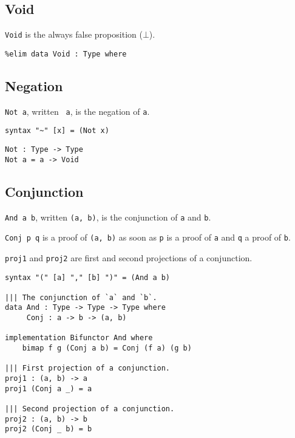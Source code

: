 \documentclass{acm_proc_article-sp}
\begin{document}
\subsection{Void}\label{void}

\texttt{Void} is the always false proposition (\(\bot\)).

\begin{verbatim}
%elim data Void : Type where
\end{verbatim}

\subsection{Negation}\label{negation}

\texttt{Not a}, written \texttt{~a}, is the
negation of \texttt{a}.

\begin{verbatim}
syntax "~" [x] = (Not x)
\end{verbatim}

\begin{verbatim}
Not : Type -> Type
Not a = a -> Void
\end{verbatim}

\subsection{Conjunction}\label{conjunction}

\texttt{And a b}, written \texttt{(a, b)}, is
the conjunction of \texttt{a} and \texttt{b}.

\texttt{Conj p q} is a proof of
\texttt{(a, b)} as soon as \texttt{p} is a
proof of \texttt{a} and \texttt{q} a proof of
\texttt{b}.

\texttt{proj1} and \texttt{proj2} are first
and second projections of a conjunction.

\begin{verbatim}
syntax "(" [a] "," [b] ")" = (And a b)

||| The conjunction of `a` and `b`.
data And : Type -> Type -> Type where
     Conj : a -> b -> (a, b)

implementation Bifunctor And where
    bimap f g (Conj a b) = Conj (f a) (g b)

||| First projection of a conjunction.
proj1 : (a, b) -> a
proj1 (Conj a _) = a

||| Second projection of a conjunction.
proj2 : (a, b) -> b
proj2 (Conj _ b) = b
\end{verbatim}
\end{document}

